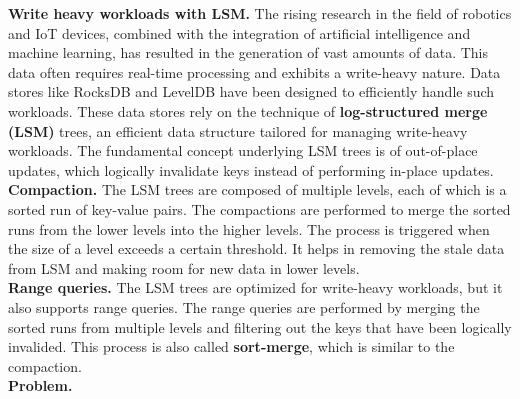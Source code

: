 \textbf{Write heavy workloads with LSM.} The rising research in the field of robotics and IoT devices, combined with the 
integration of artificial intelligence and machine learning, has resulted in the generation of vast amounts of data.
This data often requires real-time processing and exhibits a write-heavy nature. Data stores like RocksDB and LevelDB
have been designed to efficiently handle such workloads. These data stores rely on the technique of
\textbf{log-structured merge (LSM)} trees, an efficient data structure tailored for managing write-heavy workloads. The
fundamental concept underlying LSM trees is of out-of-place updates, which logically invalidate keys 
instead of performing in-place updates.\\
\textbf{Compaction.} The LSM trees are composed of multiple levels, each of which is a sorted run of key-value pairs. 
The compactions are performed to merge the sorted runs from the lower levels into the higher levels. The process is 
triggered when the size of a level exceeds a certain threshold. It helps in removing the stale data from LSM and 
making room for new data in lower levels.\\
\textbf{Range queries.} The LSM trees are optimized for write-heavy workloads, but it also supports range queries. The
range queries are performed by merging the sorted runs from multiple levels and filtering out the keys that have been
logically invalided. This process is also called \textbf{sort-merge}, which is similar to the compaction.\\
\textbf{Problem.}